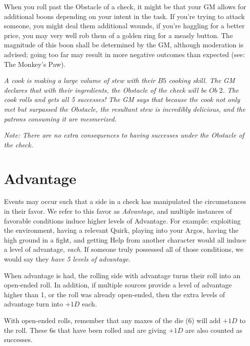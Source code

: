 \documentclass[../main.tex]{subfiles}
\begin{document}
    When you roll past the Obstacle of a check, it might be that your GM allows for additional boons depending on your intent in the task. If you're trying to attack someone, you might deal them additional wounds, if you're haggling for a better price, you may very well rob them of a golden ring for a measly button. The magnitude of this boon shall be determined by the GM, although moderation is advised; going too far may result in more negative outcomes than expected (see: The Monkey's Paw).
    \\
    \begin{mdframed}[style=Arrata]
        {\em A cook is making a large volume of stew with their $B5$ cooking skill. The GM declares that with their ingredients, the Obstacle of the check will be $Ob\; 2$. The cook rolls and gets all 5 successes! The GM says that because the cook not only met but surpassed the Obstacle, the resultant stew is incredibly delicious, and the patrons consuming it are mesmerized.}
    \end{mdframed}

    \emph{Note: There are no extra consequences to having successes under the Obstacle of the check.}
    
    \section{Advantage}

        Events may occur such that a side in a check has manipulated the circumstances in their favor. We refer to this favor as \emph{Advantage}, and multiple instances of favorable conditions induce higher levels of Advantage. For example: exploiting the environment, having a relevant Quirk, playing into your Argos, having the high ground in a fight, and getting Help from another character would all induce a level of advantage, \emph{each}. If someone truly possessed all of those conditions, we would say they \emph{have 5 levels of advantage}. 

        When advantage is had, the rolling side with advantage turns their roll into an open-ended roll. In addition, if multiple sources provide a level of advantage higher than 1, or the roll was already open-ended, then the extra levels of advantage turn into $+1D$ each.

        With open-ended rolls, remember that any maxes of the die (6) will add $+1D$ to the roll. These 6s that have been rolled and are giving $+1D$ are also counted as successes. 
        
\end{document}
